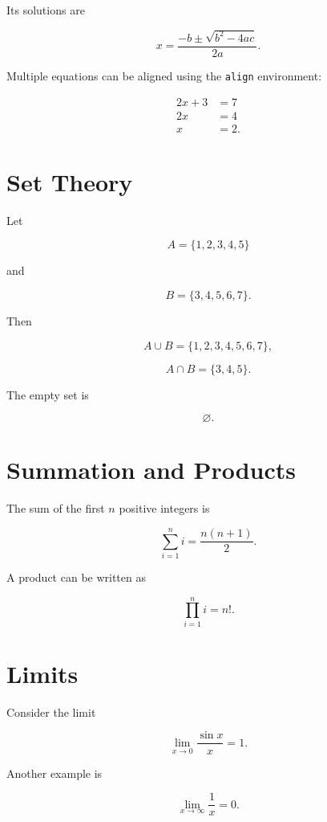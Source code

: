\documentclass[12pt,a4paper]{article}
\begin{document}
Its solutions are

\[
x = \frac{-b \pm \sqrt{b^2 - 4ac}}{2a}.
\]

Multiple equations can be aligned using the \texttt{align} environment:

\begin{align}
2x + 3 &= 7 \\
2x &= 4 \\
x &= 2.
\end{align}

\section{Set Theory}

Let

\[
A = \{1,2,3,4,5\}
\]

and

\[
B = \{3,4,5,6,7\}.
\]

Then

\[
A \cup B = \{1,2,3,4,5,6,7\},
\]

\[
A \cap B = \{3,4,5\}.
\]

The empty set is

\[
\varnothing.
\]

\section{Summation and Products}

The sum of the first \(n\) positive integers is

\[
\sum_{i=1}^{n} i
=
\frac{n(n+1)}{2}.
\]

A product can be written as

\[
\prod_{i=1}^{n} i = n!.
\]

\section{Limits}

Consider the limit

\[
\lim_{x\to 0}\frac{\sin x}{x}=1.
\]

Another example is

\[
\lim_{x\to\infty}\frac{1}{x}=0.
\]

\end{document}
